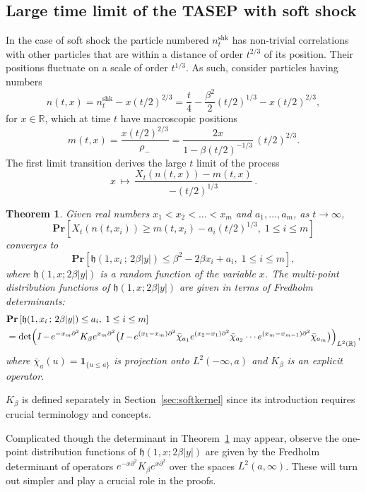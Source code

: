 \documentclass[10pt]{amsart}
\newtheorem{theo}{Theorem}[section]
\theoremstyle{definition}\newtheorem{defi}[theo]{Definition}\newtheorem{rema}[theo]{Remark}\newtheorem{exam}[theo]{Example}\newtheorem{exem}[theo]{Example}\newtheorem{nota}[theo]{Notation}
\DeclareMathOperator{\shk}{shk}
\newcommand{\pr}[1]{\mathbf{Pr}\left[#1\right]}
\newcommand{\ind}[1]{\mathbf{1}_{\{ #1 \}}}
\newcommand{\R}{\mathbb{R}}
\newcommand{\h}{\mathfrak{h}}
\newcommand*{\Mk}{\mkern -2mu}
\begin{document}
\subsection{Large time limit of the TASEP with soft shock} In the case of soft shock the particle numbered $n^{\shk}_t$ has non-trivial correlations with other particles that are within a distance of order $t^{2/3}$ of its position. Their positions fluctuate on a scale of order $t^{1/3}$. As such, consider particles having numbers
\[
n(t, x) = n^{\shk}_t - x(t/2)^{2/3} = \frac{t}{4} - \frac{\beta^2}{2}(t/2)^{1/3} - x(t/2)^{2/3},
\]
for $x \in \R$, which at time $t$ have macroscopic positions
\[
m(t,x) = \frac{x (t/2)^{2/3}}{\rho_{-}} = \frac{2x}{1-\beta(t/2)^{-1/3}}\, (t/2)^{2/3}.
\]
The first limit transition derives the large $t$ limit of the process
\begin{equation}\label{eqn:firstlim}
x \, \mapsto \, \frac{X_t(n(t,x)) - m(t,x)}{-(t/2)^{1/3}}\,.
\end{equation}

\begin{theo}\label{thm:2}
Given real numbers $x_1 < x_2 < \dots < x_m$ and $a_1, \dots, a_m$, as $ t \to \infty$,
\[
\pr{ X_t(n(t,x_i)) \geq m(t,x_i) - a_i(t/2)^{1/3},\; 1 \leq i \leq m}
\]
converges to
\[
\pr{ \h(1,x_i \,; \, 2\beta|y|) \leq \beta^2 - 2\beta x_i + a_i, \; 1 \leq i \leq m},
\]
where $\h(1,x; 2\beta|y|)$ is a random function of the variable $x$. The multi-point distribution functions of $\h(1,x; 2\beta |y|)$ are given in terms of Fredholm determinants:
\begin{align*}
& \pr{\h(1,x_i \,;\, 2\beta|y|) \leq a_i,\; 1\leq i \leq m}\\
& =\det\!\left (I \Mk-\Mk e^{-x_m \partial^2}K_{\beta}e^{x_m \partial^2}
\big (I \Mk-\Mk e^{(x_1-x_m)\partial^2}\bar{\chi}_{a_1} e^{(x_2-x_1)\partial^2} \bar{\chi}_{a_2}
\cdots e^{(x_m-x_{m-1})\partial^2}\bar{\chi}_{a_m} \big)\right)_{L^2(\R)},
\end{align*}
where $\bar{\chi}_{a}(u) = \ind{u \leq a}$ is projection onto $L^2(-\infty, a)$ and $K_{\beta}$ is an explicit operator.
\end{theo}
$K_{\beta}$ is defined separately in Section~\ref{sec:softkernel} since its introduction requires crucial terminology and concepts.

Complicated though the determinant in Theorem~\ref{thm:2} may appear, observe the one-point distribution functions of $\h(1,x; 2\beta |y|)$ are given by the Fredholm determinant of operators $e^{-x\partial^2} K_{\beta} e^{x \partial^2}$ over the spaces $L^2(a,\infty)$. These will turn out simpler and play a crucial role in the proofs.
\end{document}
